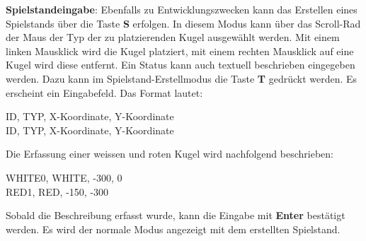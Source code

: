 \textbf{Spielstandeingabe}: Ebenfalls zu Entwicklungszwecken kann das Erstellen eines Spielstands über die Taste \textbf{S} erfolgen.
In diesem Modus kann über das Scroll-Rad der Maus der Typ der zu platzierenden Kugel ausgewählt werden. Mit einem linken Mausklick
wird die Kugel platziert, mit einem rechten Mausklick auf eine Kugel wird diese entfernt. Ein Status kann auch textuell beschrieben
eingegeben werden. Dazu kann im Spielstand-Erstellmodus die Taste \textbf{T} gedrückt werden. Es erscheint ein Eingabefeld.
Das Format lautet:
\begin{algorithm}[H]
    ID, TYP, X-Koordinate, Y-Koordinate\\
    ID, TYP, X-Koordinate, Y-Koordinate
\end{algorithm}
Die Erfassung einer weissen und roten Kugel wird nachfolgend beschrieben:\\
\begin{algorithm}[H]
    WHITE0, WHITE, -300, 0\\
    RED1, RED, -150, -300
\end{algorithm}
Sobald die Beschreibung erfasst wurde, kann die Eingabe mit \textbf{Enter} bestätigt werden. Es wird der normale Modus
angezeigt mit dem erstellten Spielstand.